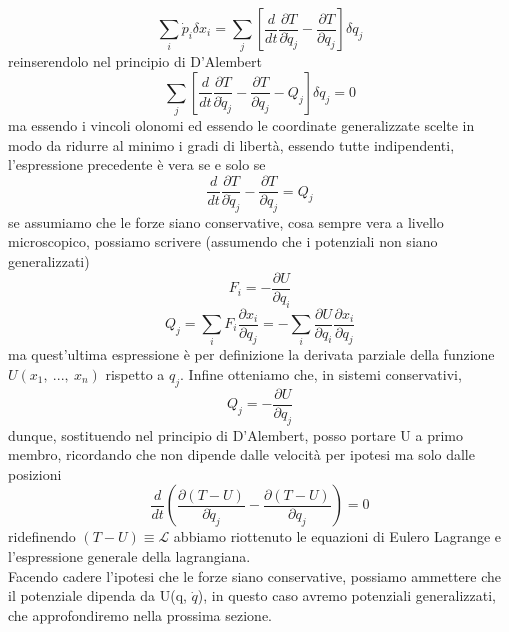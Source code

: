 \documentclass[
10pt, %
a4paper, %
oneside, %
headinclude,footinclude, %
BCOR5mm, %
]{scrartcl}
\begin{document}
\[\sum_i \dot{p}_i\delta x_i = \sum_j \left[\frac{d}{dt}\frac{\partial T}{\partial \dot{q}_j} - \frac{\partial T}{\partial q_j}\right]\delta q_j\]
reinserendolo nel principio di D'Alembert
\[\sum_j \left[\frac{d}{dt}\frac{\partial T}{\partial \dot{q}_j} - \frac{\partial T}{\partial q_j}-Q_j\right]\delta q_j = 0\]
ma essendo i vincoli olonomi ed essendo le coordinate generalizzate scelte in modo da ridurre al minimo i gradi di libertà, essendo tutte indipendenti, l'espressione precedente è vera se e solo se
\[\frac{d}{dt}\frac{\partial T}{\partial \dot{q}_j} - \frac{\partial T}{\partial q_j} = Q_j\]
se assumiamo che le forze siano conservative, cosa sempre vera a livello microscopico, possiamo scrivere (assumendo che i potenziali non siano generalizzati) 
\[F_i = -\frac{\partial U}{\partial q_i}\]
\[Q_j = \sum_i  F_i \frac{\partial x_i}{\partial q_j} = -\sum_i\frac{\partial U}{\partial q_i}\frac{\partial x_i}{\partial q_j}\]
ma quest'ultima espressione è per definizione la derivata parziale della funzione \(U(x_1,\ ..., \ x_n)\) rispetto a \(q_j\). Infine otteniamo che, in sistemi conservativi, 
\[Q_j = -\frac{\partial U}{\partial q_j}\]
dunque, sostituendo nel principio di D'Alembert, posso portare U a primo membro, ricordando che non dipende dalle velocità per ipotesi ma solo dalle posizioni
\[\frac{d}{dt}\left(\frac{\partial (T-U)}{\partial \dot{q}_j}-\frac{\partial (T-U)}{\partial q_j}\right) = 0\]
ridefinendo \((T-U)\equiv \mathcal{L}\) abbiamo riottenuto le equazioni di Eulero Lagrange e l'espressione generale della lagrangiana.\\
Facendo cadere l'ipotesi che le forze siano conservative, possiamo ammettere che il potenziale dipenda da U(q, $\dot{q}$), in questo caso avremo potenziali generalizzati, che approfondiremo nella prossima sezione.
\end{document}
